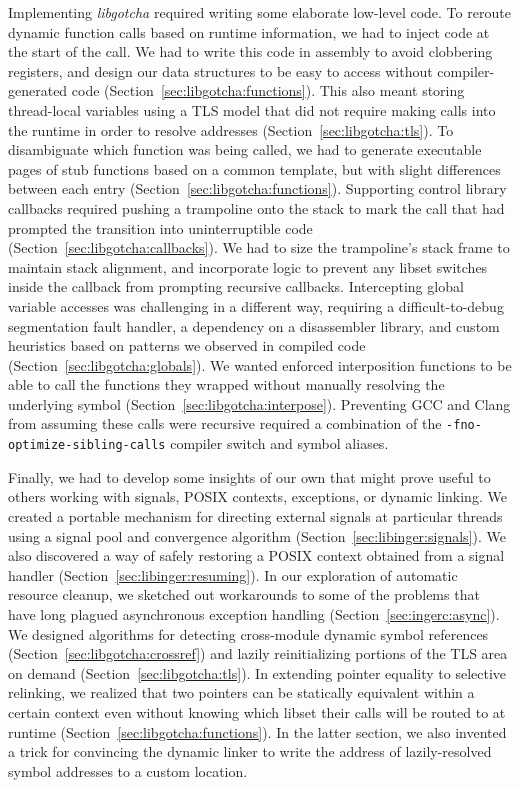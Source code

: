 Implementing \textit{libgotcha} required writing some elaborate low-level code.  To
reroute dynamic function calls based on runtime information, we had to inject code
at the start of the call.  We had to write this code in assembly to avoid clobbering
registers, and design our data structures to be easy to access without
compiler-generated code (Section~\ref{sec:libgotcha:functions}).  This also meant
storing thread-local variables using a TLS model that did not require making calls
into the runtime in order to resolve addresses (Section~\ref{sec:libgotcha:tls}).  To
disambiguate which function was being called, we had to generate executable pages of
stub functions based on a common template, but with slight differences between each
entry (Section~\ref{sec:libgotcha:functions}).  Supporting control library callbacks
required pushing a trampoline onto the stack to mark the call that had prompted the
transition into uninterruptible code  (Section~\ref{sec:libgotcha:callbacks}).  We
had to size the trampoline's stack frame to maintain stack alignment, and incorporate
logic to prevent any libset switches inside the callback from prompting recursive
callbacks.  Intercepting global variable accesses was challenging in a different way,
requiring a difficult-to-debug segmentation fault handler, a dependency on a
disassembler library, and custom heuristics based on patterns we observed in compiled
code (Section~\ref{sec:libgotcha:globals}).  We wanted enforced interposition
functions
to be able to call the functions they wrapped without manually resolving the
underlying symbol (Section~\ref{sec:libgotcha:interpose}).  Preventing GCC and Clang
from assuming these calls were recursive required a combination of the
\texttt{-fno-optimize-sibling-calls} compiler switch and symbol aliases.

Finally, we had to develop some insights of our own that might prove useful to others
working with signals, POSIX contexts, exceptions, or dynamic linking.  We created a
portable mechanism for directing external signals at particular threads using a
signal pool and convergence algorithm (Section~\ref{sec:libinger:signals}).  We also
discovered a way of safely restoring a POSIX context obtained from a signal handler
(Section~\ref{sec:libinger:resuming}).  In our exploration of automatic resource
cleanup, we sketched out workarounds to some of the problems that have long plagued
asynchronous exception handling (Section~\ref{sec:ingerc:async}).  We designed
algorithms for detecting cross-module dynamic symbol references
(Section~\ref{sec:libgotcha:crossref}) and lazily reinitializing portions of the TLS
area on demand (Section~\ref{sec:libgotcha:tls}).  In extending pointer equality
to selective relinking, we realized that two pointers can be statically equivalent
within a certain context even without knowing which libset their calls will be routed
to at runtime (Section~\ref{sec:libgotcha:functions}).  In the latter section, we
also invented a trick for convincing the dynamic linker to write the address of
lazily-resolved symbol addresses to a custom location.


